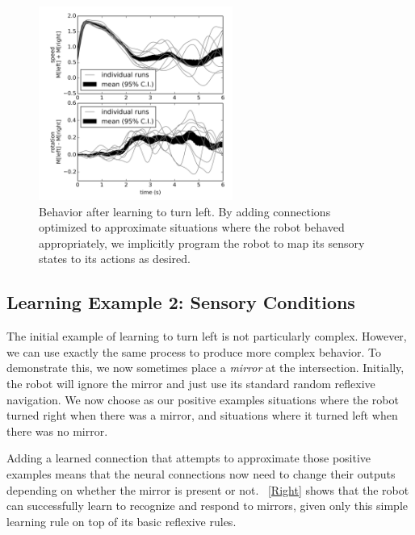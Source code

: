 \documentclass[conference]{IEEEtran}
\begin{document}
\begin{figure}[!t]
\centering
\includegraphics[width=2.5in]{learn-left/learnleft.png}
\caption{Behavior after learning to turn left. By adding connections optimized to approximate situations where the robot behaved appropriately, we implicitly program the robot to map its sensory states to its actions as desired.}
\label{Left}
\end{figure}

\subsection{Learning Example 2: Sensory Conditions} \label{learningConditions}

The initial example of learning to turn left is not particularly complex. 
However, we can use exactly the same process to produce more complex behavior.
To demonstrate this, we now sometimes place a \textit{mirror} at the intersection.
Initially, the robot will ignore the mirror and just use its standard random
reflexive navigation.  We now choose as our positive examples situations where
the robot turned right when there was a mirror, and situations where it turned
left when there was no mirror.

Adding a learned connection that attempts to approximate those positive
examples means that the neural connections now need to change their outputs
depending on whether the mirror is present or not.  \figurename~\ref{Right} shows 
that the robot can successfully learn to recognize and respond to mirrors,
given only this simple learning rule on top of its basic reflexive rules.
\end{document}
